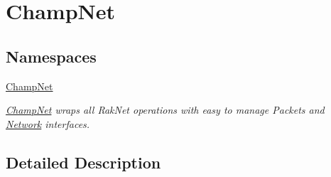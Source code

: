 \hypertarget{group__champnet}{\section{Champ\-Net}
\label{group__champnet}
}
\subsection*{Namespaces}
\begin{DoxyCompactItemize}
\item 
\hyperlink{namespace_champ_net}{Champ\-Net}
\begin{DoxyCompactList}\small\item\em \hyperlink{namespace_champ_net}{Champ\-Net} wraps all Rak\-Net operations with easy to manage Packets and \hyperlink{class_champ_net_1_1_network}{Network} interfaces. \end{DoxyCompactList}\end{DoxyCompactItemize}


\subsection{Detailed Description}
